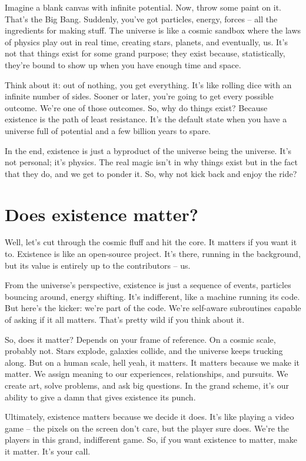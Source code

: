\documentclass{Axon}
\begin{document}
Imagine a blank canvas with infinite potential. Now, throw some paint on it. That's the Big Bang. Suddenly, you've got particles, energy, forces – all the ingredients for making stuff. The universe is like a cosmic sandbox where the laws of physics play out in real time, creating stars, planets, and eventually, us. It’s not that things exist for some grand purpose; they exist because, statistically, they’re bound to show up when you have enough time and space.

Think about it: out of nothing, you get everything. It's like rolling dice with an infinite number of sides. Sooner or later, you're going to get every possible outcome. We’re one of those outcomes. So, why do things exist? Because existence is the path of least resistance. It’s the default state when you have a universe full of potential and a few billion years to spare.

In the end, existence is just a byproduct of the universe being the universe. It’s not personal; it’s physics. The real magic isn't in why things exist but in the fact that they do, and we get to ponder it. So, why not kick back and enjoy the ride?

\section{Does existence matter?}
Well, let's cut through the cosmic fluff and hit the core. It matters if you want it to. Existence is like an open-source project. It’s there, running in the background, but its value is entirely up to the contributors – us.

From the universe's perspective, existence is just a sequence of events, particles bouncing around, energy shifting. It’s indifferent, like a machine running its code. But here’s the kicker: we’re part of the code. We’re self-aware subroutines capable of asking if it all matters. That’s pretty wild if you think about it.

So, does it matter? Depends on your frame of reference. On a cosmic scale, probably not. Stars explode, galaxies collide, and the universe keeps trucking along. But on a human scale, hell yeah, it matters. It matters because we make it matter. We assign meaning to our experiences, relationships, and pursuits. We create art, solve problems, and ask big questions. In the grand scheme, it's our ability to give a damn that gives existence its punch.

Ultimately, existence matters because we decide it does. It’s like playing a video game – the pixels on the screen don’t care, but the player sure does. We’re the players in this grand, indifferent game. So, if you want existence to matter, make it matter. It's your call.
\end{document}
